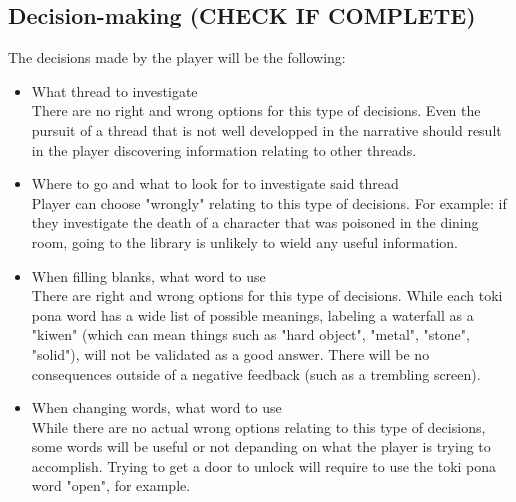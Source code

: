 \documentclass{scrartcl}
\begin{document}
		\subsection{Decision-making (CHECK IF COMPLETE)}
			The decisions made by the player will be the following:
			\begin{itemize}
				\item What thread to investigate\\
				There are no right and wrong options for this type of decisions. Even the pursuit of a thread that is not well developped in the narrative should result in the player discovering information relating to other threads.
				\item Where to go and what to look for to investigate said thread\\
				Player can choose "wrongly" relating to this type of decisions. For example: if they investigate the death of a character that was poisoned in the dining room, going to the library is unlikely to wield any useful information.
				\item When filling blanks, what word to use\\
				There are right and wrong options for this type of decisions. While each toki pona word has a wide list of possible meanings, labeling a waterfall as a "kiwen" (which can mean things such as "hard object", "metal", "stone", "solid"), will not be validated as a good answer. There will be no consequences outside of a negative feedback (such as a trembling screen).
				\item When changing words, what word to use\\
				While there are no actual wrong options relating to this type of decisions, some words will be useful or not depanding on what the player is trying to accomplish. Trying to get a door to unlock will require to use the toki pona word "open", for example.
			\end{itemize}
\end{document}
